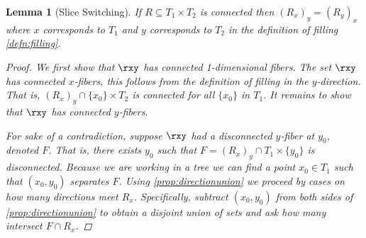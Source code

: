 \documentclass[12pt,parskip=full]{report}
\theoremstyle{plain}
\newtheorem{lem}[thm]{Lemma}
\theoremstyle{definition}
\begin{document}
\begin{lem}
    [Slice Switching]
    \label{lem:sliceswitching}
    If \(R \subseteq T_{1} \times T_{2}\) is connected then \( \left( R_{x} \right)_{y} = \left( R_{y} \right)_{x}\) where $x$ corresponds to $T_1$ and $y$ corresponds to $T_2$ in the definition of filling \ref{defn:filling}.
    \begin{proof}
        We first show that $\rxy$ has connected 1-dimensional fibers. The set $\rxy$ has connected $x$-fibers, this follows from the definition of filling in the $y$-direction. That is, $\left( R_{x} \right)_{y} \cap \{x_0\} \times T_2$ is connected for all $\{x_0\}$ in $T_1$. It remains to show that \(\rxy\) has connected $y$-fibers.
        
        For sake of a contradiction, suppose \(\rxy\) had a disconnected $y$-fiber at $y_0$, denoted $F$. That is, there exists $y_0$ such that \(F = \left( R_{x} \right)_{y}\cap T_1 \times \{y_0\}\) is disconnected. Because we are working in a tree we can find a point \(x_0\in T_1\)  such that \((x_0,y_0)\)  separates \(F\). Using \ref{prop:directionunion} we proceed by cases on how many directions meet $R_x$. Specifically, subtract \((x_0,y_0)\) from both sides of \ref{prop:directionunion} to obtain a disjoint union of sets and ask how many intersect $F \cap R_x$.
        

\end{proof}
\end{lem}
\end{document}
